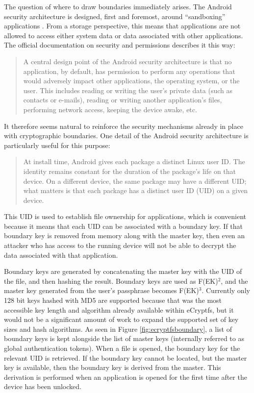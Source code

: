 The question of where to draw boundaries immediately arises. The Android security architecture is designed, first and foremost,
around ``sandboxing'' applications . From a storage perspective, this means that applications are not allowed to access either
system data or data associated with other applications. The official documentation on security and permissions describes it this way: 
\begin{quote} 
A central design point of the Android security architecture is that no application, by default, has permission to perform any
operations that would adversely impact other applications, the operating system, or the user.  This includes reading or writing the
user's private data (such as contacts or e-mails), reading or writing another application's files, performing network access,
keeping the device awake, etc. \cite{securitydoc} 
\end{quote} 
It therefore seems natural to reinforce the security
mechanisms already in place with cryptographic boundaries.  One detail of the Android security architecture is particularly useful
for this purpose: 
\begin{quote} 
At install time, Android gives each package a distinct Linux user ID. The identity remains constant
for the duration of the package's life on that device. On a different device, the same package may have a different UID; what
matters is that each package has a distinct user ID (UID) on a given device. \cite{securitydoc}
\end{quote} 
This UID is used to establish file ownership for applications, which is convenient because it means that each UID can be associated
with a boundary key.  If that boundary key is removed from memory along with the master key, then even an attacker who has access to
the running device will not be able to decrypt the data associated with that application.

Boundary keys are generated by concatenating the master key with the UID of the file, and then hashing the result.  Boundary keys
are used as F(EK)$^{2}$, and the master key generated from the user's passphrase becomes F(EK)$^{3}$. Currently
only 128 bit keys hashed with MD5 are supported because that was the most accessible key length and algorithm already available
within eCryptfs, but it would not be a significant amount of work to expand the supported set of key sizes and hash algorithms. As
seen in Figure \ref{fig:ecryptfsboundary}, a list of boundary keys is kept alongside the list of master keys (internally referred
to as global authentication tokens).  When a file is opened, the boundary key for the relevant UID is retrieved. If the boundary key
cannot be located, but the master key is available, then the boundary key is derived from the master. This derivation is performed
when an application is opened for the first time after the device has been unlocked.

